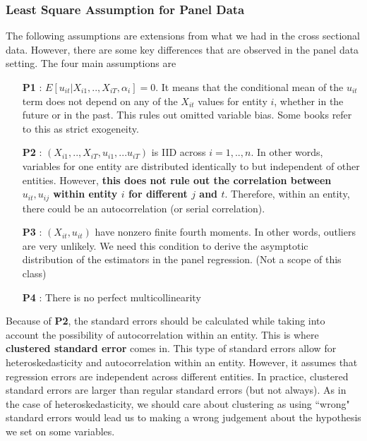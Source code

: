 \documentclass[12pt]{article}
\theoremstyle{definition}
\theoremstyle{property}
\theoremstyle{assumption}
\theoremstyle{example}
\theoremstyle{comment}
\begin{document}
\subsubsection{Least Square Assumption for Panel Data}
The following assumptions are extensions from what we had in the cross sectional data. However, there are some key differences that are observed in the panel data setting. The four main assumptions are
\begin{itemize}
\item [\textbf{P1}]: $E[u_{it}|X_{i1},..,X_{iT},\alpha_i]=0$. It means that the conditional mean of the $u_{it}$ term does not depend on any of the $X_{it}$ values for entity $i$, whether in the future or in the past. This rules out omitted variable bias. Some books refer to this as strict exogeneity. 
\item [\textbf{P2}]: $(X_{i1},..,X_{iT},u_{i1},...u_{iT})$ is IID across $i=1,..,n$. In other words, variables for one entity are distributed identically to but independent of other entities. However, \textbf{this does not rule out the correlation between $u_{it},u_{ij}$ within entity $i$ for different $j$ and $t$}. Therefore, within an entity, there could be an autocorrelation (or serial correlation).  
\item [\textbf{P3}]: $(X_{it},u_{it})$ have nonzero finite fourth moments. In other words, outliers are very unlikely. We need this condition to derive the asymptotic distribution of the estimators in the panel regression. (Not a scope of this class)
\item [\textbf{P4}]: There is no perfect multicollinearity
\end{itemize}
Because of \textbf{P2}, the standard errors should be calculated while taking into account the possibility of autocorrelation within an entity. This is where \textbf{clustered standard error} comes in. This type of standard errors allow for heteroskedasticity and autocorrelation within an entity. However, it assumes that regression errors are independent across different entities. In practice, clustered standard errors are larger than regular standard errors (but not always). As in the case of heteroskedasticity, we should care about clustering as using ``wrong" standard errors would lead us to making a wrong judgement about the hypothesis we set on some variables. \par\medskip
\end{document}
